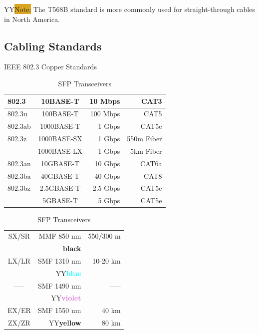 \documentclass[12pt]{article}
\newcommand{\printColor}{Y}								%
\newcommand{\textcolorbf}[2]{\if\printColor Y{\textcolor{#1}{\textbf{#2}}}\else{\textbf{#2}}\fi}
\newcommand{\note}[1]{\if\printColor Y{\colorbox{#1}{Note:}}\else{\underline{Note:}}\fi}
\begin{document}
	\note{Goldenrod} The T568B standard is more commonly used for straight-through cables in North America.


	\subsection{Cabling Standards \label{subsec:CABLING}}
	\begin{table}[H]
	\begin{minipage}[t]{.6\linewidth}
	\centering
	\caption{IEEE 802.3 Copper Standards \label{tab:802.3 COPPER}}
	\begin{tabular}{| l | c | r r |}\hline
	802.3		& 10BASE-T 		& 10 Mbps 		&CAT3\\\hline
	802.3u 	& 100BASE-T 		& 100 Mbps 	&CAT5\\\hline
	802.3ab 	& 1000BASE-T 		& 1 Gbps 		&CAT5e\\\hline
	802.3z 	& 1000BASE-SX 		& 1 Gbps		&550m Fiber\\
			& 1000BASE-LX		& 1 Gbps		&5km Fiber\\\hline
	802.3an 	& 10GBASE-T 		& 10 Gbps 		&CAT6a\\\hline
	802.3ba 	& 40GBASE-T 		& 40 Gbps 		&CAT8\\\hline
	802.3bz 	& 2.5GBASE-T 		& 2.5 Gbps 		&CAT5e\\
			& 5GBASE-T 		& 5 Gbps 		&CAT5e\\\hline
	\end{tabular}\end{minipage}\hfill
	\begin{minipage}[t]{.4\linewidth}
	\centering
	\caption{SFP Transceivers \label{tab:SFP}}
	\begin{tabular}{| c | r | r |}\hline
	SX/SR		& MMF 850 nm				& 550/300 m\\
			& \textbf{black}				&\\\hline
	LX/LR		& SMF 1310 nm				& 10-20 km\\
			& \textcolorbf{Cyan}{blue}		&\\\hline
	----- 		& SMF 1490 nm				& -----\\
			& \textcolorbf{Orchid}{violet}		&\\\hline
	EX/ER		& SMF 1550 nm				& 40 km\\
	ZX/ZR	& \textcolorbf{Dandelion}{yellow}	& 80 km\\\hline
	\end{tabular}\end{minipage}\end{table}%
	
\end{document}
